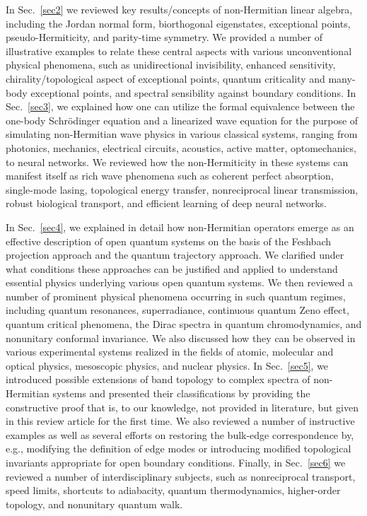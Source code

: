 \documentclass{tADP2e}
\theoremstyle{plain}
\theoremstyle{plain}
\theoremstyle{definition}
\begin{document}
In Sec.~\ref{sec2} we reviewed key results/concepts of non-Hermitian linear algebra, including the Jordan normal form, biorthogonal eigenstates, exceptional points, pseudo-Hermiticity, and parity-time symmetry. We provided a number of illustrative examples to relate these central aspects with various unconventional physical phenomena, such as unidirectional invisibility, enhanced sensitivity, chirality/topological aspect of exceptional points, quantum criticality and many-body exceptional points, and spectral sensibility against boundary conditions. In Sec.~\ref{sec3}, we explained how one can utilize the formal equivalence between the one-body Schr{\"o}dinger equation and a linearized wave equation for the purpose of simulating non-Hermitian wave physics in various classical systems, ranging from photonics, mechanics, electrical circuits, acoustics, active matter, optomechanics, to neural networks.  We reviewed how the non-Hermiticity in these systems can manifest itself as rich wave phenomena such as coherent perfect absorption, single-mode lasing, topological energy transfer, nonreciprocal linear transmission,  robust biological transport, and efficient learning of deep neural networks.

In Sec.~\ref{sec4}, we explained in detail how non-Hermitian operators emerge as an effective description of open quantum systems on the basis of the Feshbach projection approach and the quantum trajectory approach. 
We clarified under what conditions these approaches can be justified and applied to understand essential physics underlying  various open quantum systems. We then reviewed a number of prominent physical phenomena occurring in such quantum regimes, including quantum resonances, superradiance, continuous quantum Zeno effect, quantum critical phenomena, the Dirac spectra in quantum chromodynamics, and nonunitary conformal invariance. We also discussed how they can be observed in various experimental systems realized in the fields of atomic, molecular and optical physics, mesoscopic physics, and nuclear physics. In Sec.~\ref{sec5}, we introduced possible extensions of band topology to complex spectra of non-Hermitian systems and presented their classifications by providing the constructive proof that is, to our knowledge, not provided in literature, but given in this review article for the first time. We also reviewed a number of instructive examples as well  as several efforts on restoring the bulk-edge correspondence by, e.g., modifying the definition of edge modes or introducing modified topological invariants appropriate for open boundary conditions. Finally, in Sec.~\ref{sec6} we reviewed a number of interdisciplinary subjects, such as nonreciprocal transport, speed limits, shortcuts to adiabacity, quantum thermodynamics, higher-order topology, and nonunitary quantum walk.
\end{document}
